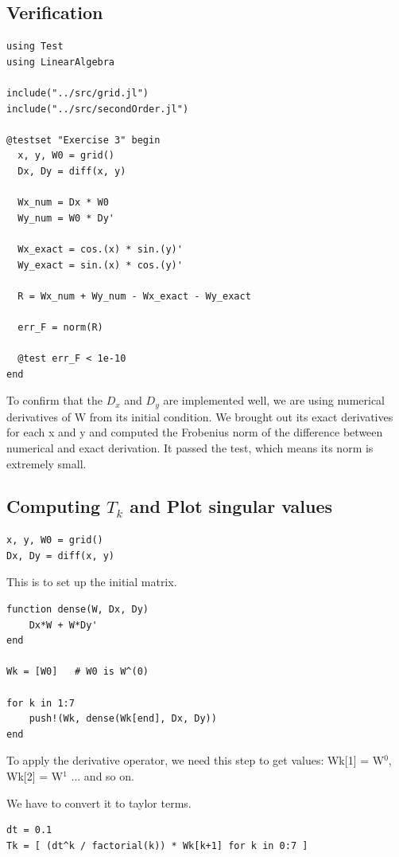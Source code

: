 \documentclass[11pt]{report}
\begin{document}
\subsection{Verification}
\begin{lstlisting}
using Test
using LinearAlgebra

include("../src/grid.jl")
include("../src/secondOrder.jl")

@testset "Exercise 3" begin
  x, y, W0 = grid()
  Dx, Dy = diff(x, y)

  Wx_num = Dx * W0
  Wy_num = W0 * Dy'

  Wx_exact = cos.(x) * sin.(y)'
  Wy_exact = sin.(x) * cos.(y)'

  R = Wx_num + Wy_num - Wx_exact - Wy_exact

  err_F = norm(R)

  @test err_F < 1e-10
end
\end{lstlisting}

To confirm that the $D_x$ and $D_y$ are implemented well, we are using numerical derivatives of W from its initial condition. We brought out its exact derivatives for each x and y and computed the Frobenius norm of the difference between numerical and exact derivation. It passed the test, which means its norm is extremely small. 

\subsection{Computing $T_k$ and Plot singular values}

\begin{lstlisting}
x, y, W0 = grid()
Dx, Dy = diff(x, y)
\end{lstlisting}
This is to set up the initial matrix. 
\begin{lstlisting}
function dense(W, Dx, Dy)
    Dx*W + W*Dy'
end

Wk = [W0]   # W0 is W^(0)

for k in 1:7
    push!(Wk, dense(Wk[end], Dx, Dy))
end
\end{lstlisting}

To apply the derivative operator, we need this step to get values:
Wk[1] = W$^{0}$, Wk[2] = W$^{1}$ ... and so on. 

We have to convert it to taylor terms.

\begin{lstlisting}
dt = 0.1
Tk = [ (dt^k / factorial(k)) * Wk[k+1] for k in 0:7 ]
\end{lstlisting}
\end{document}
